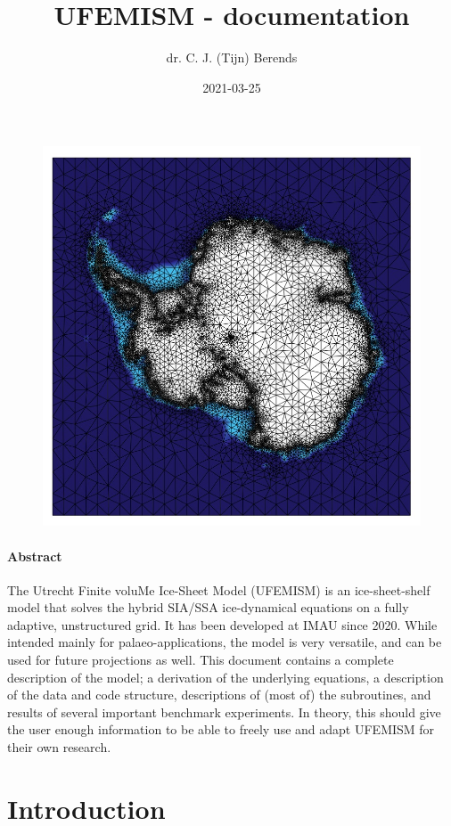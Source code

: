 \documentclass{article}
\title{UFEMISM - documentation}
\date{2021-03-25}
\author{dr. C. J. (Tijn) Berends}
\begin{document}
  \maketitle

  \begin{figure}[H]
    \centering
    \includegraphics[width=0.8\linewidth]{Fig_UFEMISM.jpg}
  \end{figure}  

  \paragraph{Abstract}
  
The Utrecht Finite voluMe Ice-Sheet Model (UFEMISM) is an ice-sheet-shelf model that solves the hybrid SIA/SSA ice-dynamical equations on a fully adaptive, unstructured grid. It has been developed at IMAU since 2020. While intended mainly for palaeo-applications, the model is very versatile, and can be used for future projections as well. This document contains a complete description of the model; a derivation of the underlying equations, a description of the data and code structure, descriptions of (most of) the subroutines, and results of several important benchmark experiments. In theory, this should give the user enough information to be able to freely use and adapt UFEMISM for their own research.
  
\newpage
\tableofcontents

\newpage
{}

\section{Introduction}
\end{document}
